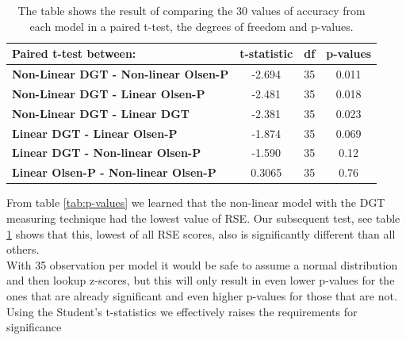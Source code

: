 \documentclass{article}
\begin{document}
\begin{table}[H]
\begin{tabular}{lccc}\toprule[1.5pt]
\textbf{Paired t-test between:}                          & \multicolumn{1}{l}{\textbf{t-statistic}} & \multicolumn{1}{l}{\textbf{df}} & \multicolumn{1}{l}{\textbf{p-values}} \\\midrule
\textbf{Non-Linear DGT - Non-linear Olsen-P} & -2.694                                   & 35                              & 0.011                                 \\\midrule
\textbf{Non-Linear DGT - Linear Olsen-P}     & -2.481                                   & 35                              & 0.018                                 \\\midrule
\textbf{Non-Linear DGT - Linear DGT}         & -2.381                                   & 35                              & 0.023                                 \\\midrule
\textbf{Linear DGT - Linear Olsen-P}         & -1.874                                   & 35                              & 0.069                                 \\\midrule
\textbf{Linear DGT - Non-linear Olsen-P}     & -1.590                                   & 35                              & 0.12                                  \\\midrule
\textbf{Linear Olsen-P - Non-linear Olsen-P} & 0.3065                                   & 35                              & 0.76                      \\
\bottomrule[1.25pt]           
\end{tabular}
\caption{The table shows the result of comparing the 30 values of accuracy from each model in a paired t-test, the degrees of freedom and p-values.}
\label{tab:BAPcompare}
\end{table}


From table \ref{tab:p-values} we learned that the non-linear model with the DGT measuring technique had the lowest value of RSE. Our subsequent test, see table \ref{tab:BAPcompare} shows that this, lowest of all RSE scores, also is significantly different than all others. \\
With 35 observation per model it would be safe to assume a normal distribution and then lookup z-scores, but this will only result in even lower p-values for the ones that are already significant and even higher p-values for those that are not. Using the Student's t-statistics we effectively raises the requirements for significance	
\end{document}
